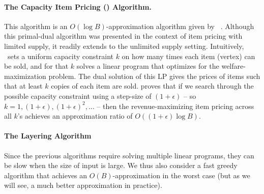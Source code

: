 \paragraph{The Capacity Item Pricing (\cip) Algorithm.}
This algorithm is an $O(\log B)$-approximation algorithm given by ~\cite{cheung2008approximation}.
Although this primal-dual algorithm was presented in the context of item pricing with limited supply, it readily extends to the unlimited supply setting. Intuitively, \cip\ sets a uniform capacity constraint $k$ on how many times each item (vertex) can be sold, and for that $k$ solves a linear program that optimizes for the welfare-maximization problem.  The dual solution of this LP gives the prices of items such that at least $k$ copies of each item are sold. \cite{cheung2008approximation} proves that if we search through the possible capacity constraint using a step-size of $(1+\epsilon)$ -- so $k = 1, (1+\epsilon), (1+\epsilon)^2, \dots$ -- then the revenue-maximizing item pricing across all $k$'s achieves an approximation ratio of $O((1+\epsilon) \log B)$.
 
%		
%		

\paragraph{The Layering Algorithm}
Since the previous algorithms require solving multiple linear programs, they can be slow when the size of input is large.  We thus also
consider a fast greedy algorithm that achieves an $O(B)$-approximation in the worst case (but as we will see, a much better approximation
in practice).

